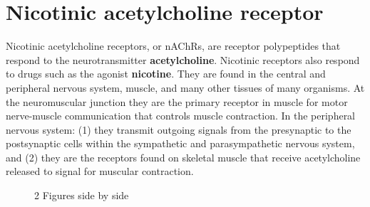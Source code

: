 \documentclass{book}
\begin{document}
\section{Nicotinic acetylcholine receptor}
Nicotinic acetylcholine receptors, or nAChRs, are receptor polypeptides that respond to the neurotransmitter \textbf{acetylcholine}. 
Nicotinic receptors also respond to drugs such as the agonist \textbf{nicotine}. 
They are found in the central and peripheral nervous system, muscle, and many other tissues of many organisms. 
At the neuromuscular junction they are the primary receptor in muscle for motor nerve-muscle communication that controls muscle contraction. 
In the peripheral nervous system: (1) they transmit outgoing signals from the presynaptic to the postsynaptic cells within the sympathetic and parasympathetic nervous system, and (2) they are the receptors found on skeletal muscle that receive acetylcholine released to signal for muscular contraction.

\begin{figure}%
    \centering
    \qquad
    \caption{2 Figures side by side}%
    \label{fig:example}%
\end{figure}



\printbibliography
\end{document}
